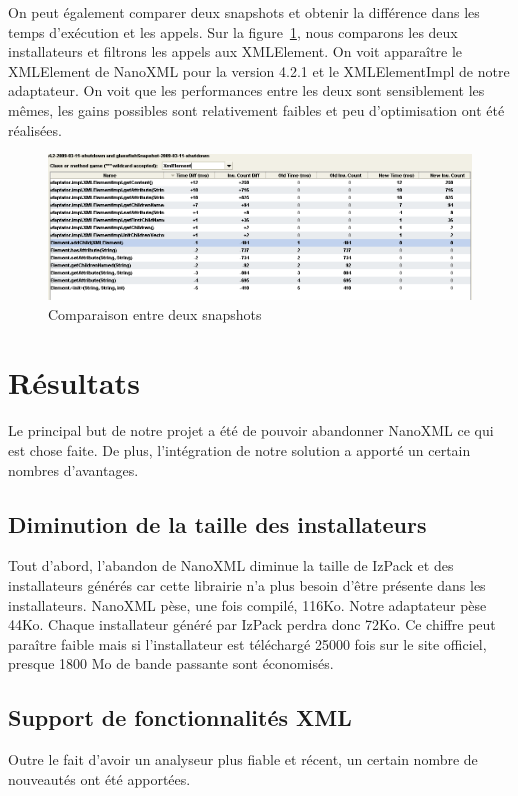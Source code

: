 On peut également comparer deux snapshots et obtenir la différence dans les temps d'exécution et les appels.
Sur la figure~\ref{fig:yourkitComparaison}, nous comparons les deux installateurs et filtrons les appels aux XMLElement.
On voit apparaître le XMLElement de NanoXML pour la version 4.2.1 et le XMLElementImpl de notre adaptateur.
On voit que les performances entre les deux sont sensiblement les mêmes, les gains possibles sont relativement faibles et peu d'optimisation ont été réalisées.
\begin{figure}[H]
	\centering
	\includegraphics[width=1\textwidth]{../image/yourkitComparaison.png}
	\caption{Comparaison entre deux snapshots}
	\label{fig:yourkitComparaison}
\end{figure}

\section{Résultats}
Le principal but de notre projet a été de pouvoir abandonner NanoXML ce qui est chose faite.
De plus, l'intégration de notre solution a apporté un certain nombres d'avantages.
\subsection{Diminution de la taille des installateurs}
Tout d'abord, l'abandon de NanoXML diminue la taille de IzPack et des installateurs générés car cette librairie n'a plus besoin d'être présente dans les installateurs.
NanoXML pèse, une fois compilé, 116Ko.
Notre adaptateur pèse 44Ko.
Chaque installateur généré par IzPack perdra donc 72Ko.
Ce chiffre peut paraître faible mais si l'installateur est téléchargé 25000 fois sur le site officiel, presque 1800 Mo de bande passante sont économisés.
\subsection{Support de fonctionnalités XML}
Outre le fait d'avoir un analyseur plus fiable et récent, un certain nombre de nouveautés ont été apportées.
